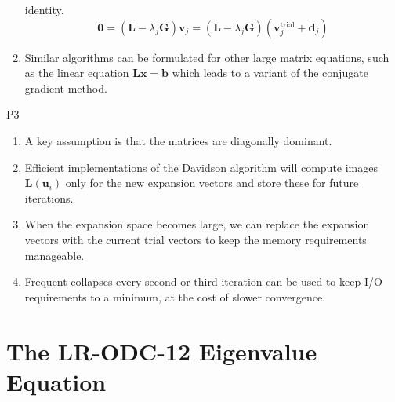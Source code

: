 \begin{enumerate}
        identity.
        \begin{equation}
            \mathbf{0}
            =
            (\mathbf{L} - \lambda_j\mathbf{G})
            \mathbf{v}_j
            =
            (\mathbf{L} - \lambda_j\mathbf{G})
            (
                \mathbf{v}_j^\mathrm{trial}
                +
                \mathbf{d}_j
            )
        \end{equation}
    \item
        Similar algorithms can be formulated for other large matrix equations,
        such as the linear equation \(\mathbf{L}\mathbf{x}=\mathbf{b}\) which
        leads to a variant of the conjugate gradient method.
\end{enumerate}

\noindent
P3
\begin{enumerate}
    \item
        A key assumption is that the matrices are diagonally dominant.
    \item
        Efficient implementations of the Davidson algorithm will compute images
        \(
            \mathbf{L}(\mathbf{u}_i)
        \)
        only for the new expansion vectors and store these for future
        iterations.
    \item
        When the expansion space becomes large, we can replace the expansion
        vectors with the current trial vectors to keep the memory requirements
        manageable.
    \item
        Frequent collapses every second or third iteration can be used to keep
        I/O requirements to a minimum, at the cost of slower
        convergence.\cite{Leininger:2001p1574}
\end{enumerate}

\section{The LR-ODC-12 Eigenvalue Equation}
\label{sec:davidson:eig}

